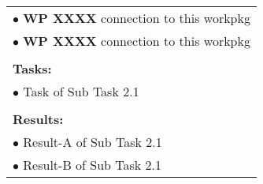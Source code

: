 \begin{table}[!h]
\begin{center}
\begin{tabular}{|p{}||p{}|p{}||p{}|}
            \multicolumn{4}{|p{.95\columnwidth}|}{$\bullet$ \textbf{WP XXXX} connection to this workpkg}\\
            \multicolumn{4}{|p{.95\columnwidth}|}{$\bullet$ \textbf{WP XXXX} connection to this workpkg}\\
            \multicolumn{4}{|p{.95\columnwidth}|}{}\\
            \multicolumn{4}{|p{.95\columnwidth}|}{\textbf{Tasks:}}\\
            \multicolumn{4}{|p{.95\columnwidth}|}{$\bullet$ Task of Sub Task 2.1}\\
            \multicolumn{4}{|p{.95\columnwidth}|}{}\\
            \multicolumn{4}{|p{.95\columnwidth}|}{\textbf{Results:}}\\
            \multicolumn{4}{|p{.95\columnwidth}|}{$\bullet$ Result-A of Sub Task 2.1}\\
            \multicolumn{4}{|p{.95\columnwidth}|}{$\bullet$ Result-B of Sub Task 2.1}\\
            \hline
        \end{tabular}
    \end{center}
\end{table}

\clearpage

